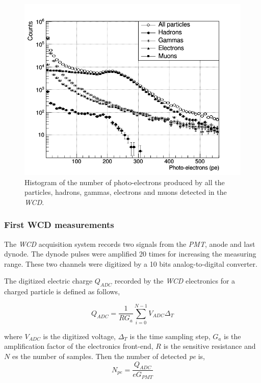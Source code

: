 \documentclass[submitting]{nst}
\begin{document}
\begin{figure}
    \centering
    \includegraphics[scale=0.4]{Figures/flux.png}
    \caption{Histogram of the number of photo-electrons produced by all the particles, hadrons, gammas, electrons and muons detected in the \textsl{WCD}.}
    \label{fig:flux}
\end{figure}

\subsubsection{First WCD measurements}\label{sec:wcd-data}%

The \textsl{WCD} acquisition system records two signals from the \textsl{PMT}, anode and last dynode. The dynode pulses were amplified 20 times for increasing the measuring range. These two channels were digitized by a 10 bits analog-to-digital converter.

The digitized electric charge $Q_{ADC}$ recorded by the \textsl{WCD} electronics for a charged particle is defined as follows,

\begin{equation}
\label{n_FE}
Q_{ADC} =  \frac{1}{RG_{a}}\sum_{i=0}^{N-1} V_{ADC} \Delta_T
\end{equation}

where $V_{ADC}$ is the digitized voltage, $\Delta_T$ is the time sampling step, $G_a$ is the amplification factor of the electronics front-end, $R$ is the sensitive resistance and $N$ es the number of samples. Then the number of detected \textsl{pe} is,
\begin{equation}
\label{n_FE}
N_{pe} = \frac{Q_{ADC}}{eG_{PMT}}
\end{equation}
\end{document}
